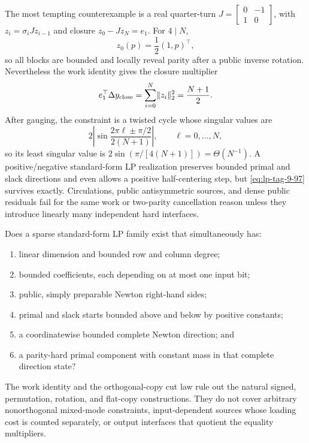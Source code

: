 The most tempting counterexample is a real quarter-turn
\(J=\left[\begin{smallmatrix}0&-1\\1&0\end{smallmatrix}\right]\), with
\(z_i=\sigma_iJz_{i-1}\) and closure \(z_0-Jz_N=e_1\).  For \(4\mid N\),
\begin{equation}
 z_0(p)=\frac12(1,p)^\top,
\end{equation}
so all blocks are bounded and locally reveal parity after a public inverse
rotation.  Nevertheless the work identity gives the closure multiplier
\begin{equation}
 e_1^\top\Delta y_{\rm close}=\sum_{i=0}^N\lVert z_i\rVert_2^2
 =\frac{N+1}{2}.
\label{eq:lp-tag-9-97}
\end{equation}
After gauging, the constraint is a twisted cycle whose singular values are
\begin{equation}
 2\left|\sin\frac{2\pi\ell\pm\pi/2}{2(N+1)}\right|,
 \qquad \ell=0,\ldots,N,
\end{equation}
so its least singular value is
\(2\sin(\pi/[4(N+1)])=\Theta(N^{-1})\).  A positive/negative standard-form
LP realization preserves bounded primal and slack directions and even allows
a positive half-centering step, but \eqref{eq:lp-tag-9-97} survives exactly.  Circulations,
public antisymmetric sources, and dense public residuals fail for the same
work or two-parity cancellation reason unless they introduce linearly many
independent hard interfaces.

\begin{openproblem}
\label{open:lp-bounded-full-kkt}
Does a sparse standard-form LP family exist that simultaneously has:
\begin{enumerate}[label=(\roman*)]
 \item linear dimension and bounded row and column degree;
 \item bounded coefficients, each depending on at most one input bit;
 \item public, simply preparable Newton right-hand sides;
 \item primal and slack starts bounded above and below by positive constants;
 \item a coordinatewise bounded complete Newton direction; and
 \item a parity-hard primal component with constant mass in that complete
 direction state?
\end{enumerate}
The work identity and the orthogonal-copy cut law rule out the natural signed,
permutation, rotation, and flat-copy constructions.  They do not cover
arbitrary nonorthogonal mixed-mode constraints, input-dependent sources whose
loading cost is counted separately, or output interfaces that quotient the equality
multipliers.
\end{openproblem}


